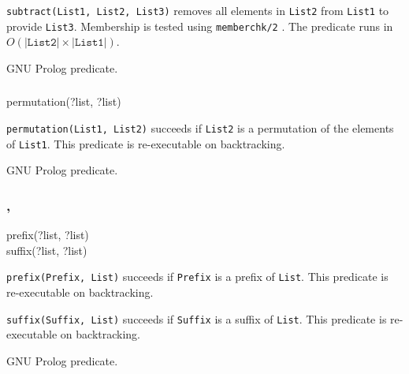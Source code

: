 \Description

\texttt{subtract(List1, List2, List3)} removes all elements in \texttt{List2}
from \texttt{List1} to provide \texttt{List3}. Membership is tested using
\texttt{memberchk/2} . The predicate runs in
$O(|\texttt{List2}| \times |\texttt{List1}|)$.

\PlErrorsNone

\Portability

GNU Prolog predicate.

\subsubsection{}

\begin{TemplatesOneCol}
permutation(?list, ?list)

\end{TemplatesOneCol}

\Description

\texttt{permutation(List1, List2)} succeeds if \texttt{List2}
is a permutation of the elements of \texttt{List1}. This predicate is
re-executable on backtracking.

\PlErrorsNone

\Portability

GNU Prolog predicate.

\subsubsection{,
               }

\begin{TemplatesOneCol}
prefix(?list, ?list)\\
suffix(?list, ?list)

\end{TemplatesOneCol}

\Description

\texttt{prefix(Prefix, List)} succeeds if \texttt{Prefix} is a prefix of
\texttt{List}. This predicate is re-executable on backtracking.

\texttt{suffix(Suffix, List)} succeeds if \texttt{Suffix} is a suffix of
\texttt{List}. This predicate is re-executable on backtracking.

\PlErrorsNone

\Portability

GNU Prolog predicate.

\subsubsection{}

